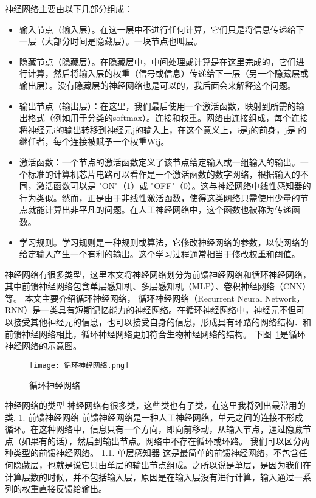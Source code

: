 神经网络主要由以下几部分组成：
\begin{itemize}
    \item 输入节点（输入层）。在这一层中不进行任何计算，它们只是将信息传递给下一层（大部分时间是隐藏层）。一块节点也叫层。
    \item 隐藏节点（隐藏层）。在隐藏层中，中间处理或计算是在这里完成的，它们进行计算，然后将输入层的权重（信号或信息）传递给下一层（另一个隐藏层或输出层）。没有隐藏层的神经网络也是可以的，我后面会来解释这个问题。
    \item 输出节点（输出层）：在这里，我们最后使用一个激活函数，映射到所需的输出格式（例如用于分类的softmax）。连接和权重。网络由连接组成，每个连接将神经元i的输出转移到神经元j的输入上，在这个意义上，i是j的前身，j是i的继任者，每个连接被赋予一个权重Wij。
    \item 激活函数：一个节点的激活函数定义了该节点给定输入或一组输入的输出。一个标准的计算机芯片电路可以看作是一个激活函数的数字网络，根据输入的不同，激活函数可以是 "ON"（1）或 "OFF"（0）。这与神经网络中线性感知器的行为类似。然而，正是由于非线性激活函数，使得这类网络只需使用少量的节点就能计算出非平凡的问题。在人工神经网络中，这个函数也被称为传递函数。
    \item 学习规则。学习规则是一种规则或算法，它修改神经网络的参数，以使网络的给定输入产生一个有利的输出。这个学习过程通常相当于修改权重和阈值。
\end{itemize}

神经网络有很多类型，这里本文将神经网络划分为前馈神经网络和循环神经网络，其中前馈神经网络包含单层感知机、多层感知机（MLP）、卷积神经网络（CNN）等。
本文主要介绍循环神经网络， 循环神经网络（Recurrent Neural Network，RNN）是一类具有短期记忆能力的神经网络。在循环神经网络中，神经元不但可以接受其他神经元的信息，也可以接受自身的信息，形成具有环路的网络结构．和前馈神经网络相比，循环神经网络更加符合生物神经网络的结构。
下图~\ref{fig:循环神经网络}是循环神经网络的示意图。
\begin{figure}
    \centering
    \texttt{[image: 循环神经网络.png]}
    \caption{循环神经网络}
    \label{fig:循环神经网络}
  \end{figure}


神经网络的类型
神经网络有很多类，这些类也有子类，在这里我将列出最常用的类.
1. 前馈神经网络
前馈神经网络是一种人工神经网络，单元之间的连接不形成循环。在这种网络中，信息只有一个方向，即向前移动，从输入节点，通过隐藏节点（如果有的话），然后到输出节点。网络中不存在循环或环路。
我们可以区分两种类型的前馈神经网络。
1.1. 单层感知器
这是最简单的前馈神经网络，不包含任何隐藏层，也就是说它只由单层的输出节点组成。之所以说是单层，是因为我们在计算层数的时候，并不包括输入层，原因是在输入层没有进行计算，输入通过一系列的权重直接反馈给输出。

